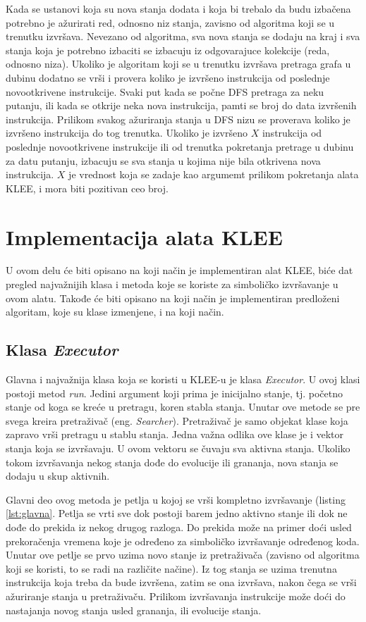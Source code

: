 \documentclass[12pt,oneside]{memoir}
\begin{document}
Kada se ustanovi koja su nova stanja dodata i koja bi trebalo da budu izbačena potrebno je ažurirati red, odnosno niz stanja, zavisno od algoritma koji se u trenutku izvršava. Nevezano od algoritma, sva nova stanja se dodaju na kraj i sva stanja koja je potrebno izbaciti se izbacuju iz odgovarajuce kolekcije (reda, odnosno niza). Ukoliko je algoritam koji se u trenutku izvršava pretraga grafa u dubinu dodatno se vrši i provera koliko je izvršeno instrukcija od poslednje novootkrivene instrukcije. Svaki put kada se počne DFS pretraga za neku putanju, ili kada se otkrije neka nova instrukcija, pamti se broj do data izvršenih instrukcija. Prilikom svakog ažuriranja stanja u DFS nizu se proverava koliko je izvršeno instrukcija do tog trenutka. Ukoliko je izvršeno $X$ instrukcija od poslednje novootkrivene instrukcije ili od trenutka pokretanja pretrage u dubinu za datu putanju, izbacuju se sva stanja u kojima nije bila otkrivena nova instrukcija. $X$ je vrednost koja se zadaje kao argumemt prilikom pokretanja alata KLEE, i mora biti pozitivan ceo broj.

\section{Implementacija alata KLEE}
U ovom delu će biti opisano na koji način je implementiran alat KLEE, biće dat pregled najvažnijih klasa i metoda koje se koriste za simboličko izvršavanje u ovom alatu. Takođe će biti opisano na koji način je implementiran predloženi algoritam, koje su klase izmenjene, i na koji način.

\subsection{Klasa \textit{Executor}}
Glavna i najvažnija klasa koja se koristi u KLEE-u je klasa \textit{Executor}. U ovoj klasi postoji metod \textit{run}. Jedini argument koji prima je inicijalno stanje, tj. početno stanje od koga se kreće u pretragu, koren stabla stanja. Unutar ove metode se pre svega kreira pretraživač (eng. \textit{Searcher}). 
Pretraživač je samo objekat klase koja zapravo vrši pretragu u stablu stanja. Jedna važna odlika ove klase je i vektor stanja koja se izvršavaju. U ovom vektoru se čuvaju sva aktivna stanja. Ukoliko tokom izvršavanja nekog stanja dođe do evolucije ili grananja, nova stanja se dodaju u skup aktivnih.

Glavni deo ovog metoda je petlja u kojoj se vrši kompletno izvršavanje (listing \ref{lst:glavna}. Petlja se vrti sve dok postoji barem jedno aktivno stanje ili dok ne dođe do prekida iz nekog drugog razloga. Do prekida može na primer doći usled prekoračenja vremena koje je određeno za simboličko izvršavanje određenog koda. Unutar ove petlje se prvo uzima novo stanje iz pretraživača (zavisno od algoritma koji se koristi, to se radi na različite načine). Iz tog stanja se uzima trenutna instrukcija koja treba da bude izvršena, zatim se ona izvršava, nakon čega se vrši ažuriranje stanja u pretraživaču. Prilikom izvršavanja instrukcije može doći do nastajanja novog stanja usled grananja, ili evolucije stanja. 
\end{document}
